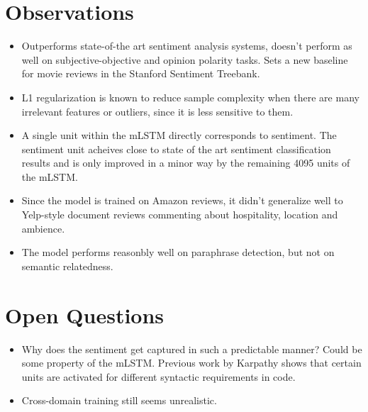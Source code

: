 \documentclass[12pt]{scrartcl}
\begin{document}
\section{Observations}
  \begin{itemize}
    \item Outperforms state-of-the art sentiment analysis systems, doesn't perform as well on subjective-objective and opinion polarity tasks. Sets a new baseline for movie reviews in the Stanford Sentiment Treebank.
    \item L1 regularization is known to reduce sample complexity when there are
    many irrelevant features or outliers, since it is less sensitive to them.
    \item A single unit within the mLSTM directly corresponds to sentiment. The sentiment unit acheives close to state of the art sentiment classification results and is only improved in a minor way by the remaining 4095 units of the mLSTM.
    \item Since the model is trained on Amazon reviews, it didn't generalize well to Yelp-style document reviews commenting about hospitality, location and ambience.
    \item The model performs reasonbly well on paraphrase detection, but not on semantic relatedness.
  \end{itemize}

\section{Open Questions}
  \begin{itemize}
    \item Why does the sentiment get captured in such a predictable manner? Could be some property of the mLSTM. Previous work by Karpathy \cite{karpathy2015visualizing} shows that certain units are activated for different syntactic requirements in code.
    \item Cross-domain training still seems unrealistic.
  \end{itemize}



\end{document}
